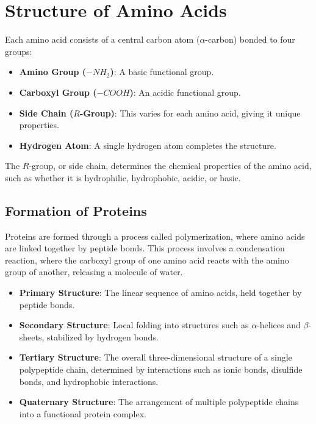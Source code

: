\documentclass[English, Lau, oneside]{sapthesis}
\begin{document}
\section{Structure of Amino Acids}
Each amino acid consists of a central carbon atom (\(\alpha\)-carbon) bonded to four groups:\cite{ref2}
\begin{itemize}
    \item \textbf{Amino Group (\(-NH_2\))}: A basic functional group.
    \item \textbf{Carboxyl Group (\(-COOH\))}: An acidic functional group.
    \item \textbf{Side Chain (\(R\)-Group)}: This varies for each amino acid, giving it unique properties.
    \item \textbf{Hydrogen Atom}: A single hydrogen atom completes the structure.
\end{itemize}

The \(R\)-group, or side chain, determines the chemical properties of the amino acid, such as whether it is hydrophilic, hydrophobic, acidic, or basic.

\subsection{Formation of Proteins}
Proteins are formed through a process called polymerization, where amino acids are linked together by peptide bonds. This process involves a condensation reaction, where the carboxyl group of one amino acid reacts with the amino group of another, releasing a molecule of water.\cite{ref3}

\begin{itemize}
    \item \textbf{Primary Structure}: The linear sequence of amino acids, held together by peptide bonds.
    \item \textbf{Secondary Structure}: Local folding into structures such as \(\alpha\)-helices and \(\beta\)-sheets, stabilized by hydrogen bonds.
    \item \textbf{Tertiary Structure}: The overall three-dimensional structure of a single polypeptide chain, determined by interactions such as ionic bonds, disulfide bonds, and hydrophobic interactions.
    \item \textbf{Quaternary Structure}: The arrangement of multiple polypeptide chains into a functional protein complex.
\end{itemize}
\end{document}
